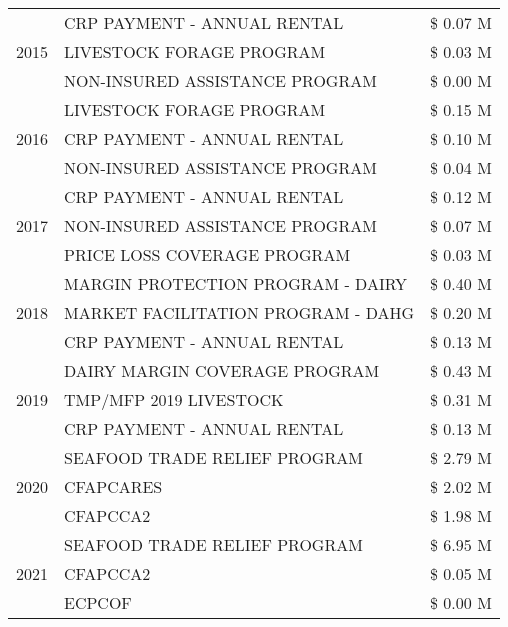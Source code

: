 \begin{tabular}{llr}
\cline{1-3}
\multirow[t]{3}{*}{2015} & CRP PAYMENT - ANNUAL RENTAL & \$ 0.07 M \\
 & LIVESTOCK FORAGE PROGRAM & \$ 0.03 M \\
 & NON-INSURED ASSISTANCE PROGRAM & \$ 0.00 M \\
\cline{1-3}
\multirow[t]{3}{*}{2016} & LIVESTOCK FORAGE PROGRAM & \$ 0.15 M \\
 & CRP PAYMENT - ANNUAL RENTAL & \$ 0.10 M \\
 & NON-INSURED ASSISTANCE PROGRAM & \$ 0.04 M \\
\cline{1-3}
\multirow[t]{3}{*}{2017} & CRP PAYMENT - ANNUAL RENTAL & \$ 0.12 M \\
 & NON-INSURED ASSISTANCE PROGRAM & \$ 0.07 M \\
 & PRICE LOSS COVERAGE PROGRAM & \$ 0.03 M \\
\cline{1-3}
\multirow[t]{3}{*}{2018} & MARGIN PROTECTION PROGRAM - DAIRY & \$ 0.40 M \\
 & MARKET FACILITATION PROGRAM - DAHG & \$ 0.20 M \\
 & CRP PAYMENT - ANNUAL RENTAL & \$ 0.13 M \\
\cline{1-3}
\multirow[t]{3}{*}{2019} & DAIRY MARGIN COVERAGE PROGRAM & \$ 0.43 M \\
 & TMP/MFP 2019 LIVESTOCK & \$ 0.31 M \\
 & CRP PAYMENT - ANNUAL RENTAL & \$ 0.13 M \\
\cline{1-3}
\multirow[t]{3}{*}{2020} & SEAFOOD TRADE RELIEF PROGRAM & \$ 2.79 M \\
 & CFAPCARES & \$ 2.02 M \\
 & CFAPCCA2 & \$ 1.98 M \\
\cline{1-3}
\multirow[t]{3}{*}{2021} & SEAFOOD TRADE RELIEF PROGRAM & \$ 6.95 M \\
 & CFAPCCA2 & \$ 0.05 M \\
 & ECPCOF & \$ 0.00 M \\
\cline{1-3}
\bottomrule
\end{tabular}
